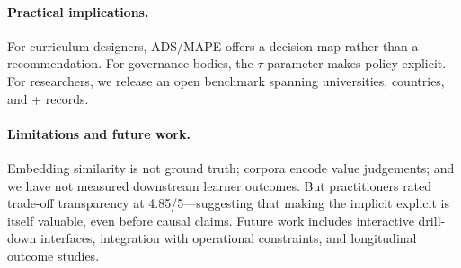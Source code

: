 \documentclass[sigconf,review]{acmart}
\newcommand{\ADS}{\textsc{ADS}\xspace}
\newcommand{\MAPE}{\textsc{MAPE}\xspace}
\begin{document}
\paragraph{Practical implications.}
For curriculum designers, \ADS/\MAPE offers a decision map rather than a recommendation. For governance bodies, the $\tau$ parameter makes policy explicit. For researchers, we release an open benchmark spanning {\NumUniversities} universities, {\NumCountries} countries, and {\HeadlineRecords}+ records.

\paragraph{Limitations and future work.}
Embedding similarity is not ground truth; corpora encode value judgements; and we have not measured downstream learner outcomes. But practitioners rated trade-off transparency at 4.85/5---suggesting that making the implicit explicit is itself valuable, even before causal claims. Future work includes interactive drill-down interfaces, integration with operational constraints, and longitudinal outcome studies.



\end{document}
